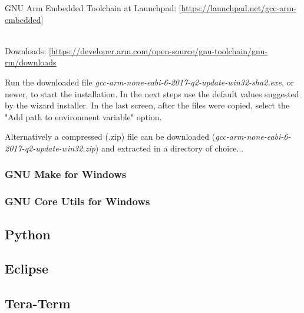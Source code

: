 \begin{flushleft}
GNU Arm Embedded Toolchain at Launchpad:
[\href{https://launchpad.net/gcc-arm-embedded}{https://launchpad.net/gcc-arm-embedded}]\\
\end{flushleft}

\begin{flushleft}
\\

Downloads: [\href{https://developer.arm.com/open-source/gnu-toolchain/gnu-rm/downloads}{https://developer.arm.com/open-source/gnu-toolchain/gnu-rm/downloads}\\
\end{flushleft}

Run the downloaded file \textit{gcc-arm-none-eabi-6-2017-q2-update-win32-sha2.exe}, or newer, to start the installation.
In the next steps use the default values suggested by the wizard installer.
In the last screen, after the files were copied, select the "Add path to environment variable" option.

Alternatively a compressed (.zip) file can be downloaded (\textit{gcc-arm-none-eabi-6-2017-q2-update-win32.zip}) and extracted in a directory of choice...

\subsubsection{GNU Make for Windows}

\subsubsection{GNU Core Utils for Windows}

\subsection{Python}

\subsection{Eclipse}

\subsection{Tera-Term}

